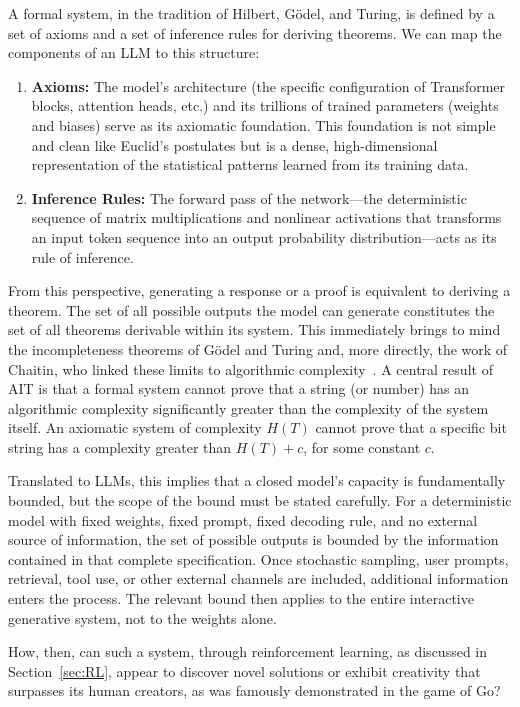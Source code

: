 \documentclass[%
  reprint,
  superscriptaddress,
  showpacs,
  showkeys,
  amsmath,amssymb,
  pra,
  longbibliography,
  floatfix,
  x11names
]{revtex4-2}
\begin{document}
A formal system, in the tradition of Hilbert, G\"odel, and Turing, is defined by a set of axioms and a set of inference rules for deriving theorems.
We can map the components of an LLM to this structure:
\begin{enumerate}
    \item \textbf{Axioms:} The model's architecture (the specific configuration of Transformer blocks, attention heads, etc.) and its trillions of trained parameters (weights and biases) serve as its axiomatic foundation. This foundation is not simple and clean like Euclid's postulates but is a dense, high-dimensional representation of the statistical patterns learned from its training data.
    \item \textbf{Inference Rules:} The forward pass of the network---the deterministic sequence of matrix multiplications and nonlinear activations that transforms an input token sequence into an output probability distribution---acts as its rule of inference.
\end{enumerate}

From this perspective, generating a response or a proof is equivalent to deriving a theorem.
The set of all possible outputs the model can generate constitutes the set of all theorems
derivable within its system.
This immediately brings to mind the incompleteness theorems of G\"odel and Turing and,
 more directly, the work of Chaitin,
who linked these limits to algorithmic complexity~\cite{chaitin-ACM,Chaitin199283,chaitin2}.
A central result of AIT is that a formal system cannot prove that a string (or number)
has an algorithmic complexity significantly greater than the complexity of the system itself.
An axiomatic system of complexity $H(T)$ cannot prove that a specific bit string
has a complexity greater than $H(T)+c$, for some constant $c$.

Translated to LLMs, this implies that a closed model's capacity is fundamentally bounded, but the scope of the bound must be stated carefully.
For a deterministic model with fixed weights, fixed prompt, fixed decoding rule, and no external source of information, the set of possible outputs is bounded by the information contained in that complete specification.
Once stochastic sampling, user prompts, retrieval, tool use, or other external channels are included, additional information enters the process.
The relevant bound then applies to the entire interactive generative system, not to the weights alone.

How, then, can such a system, through reinforcement learning, as discussed in Section~\ref{sec:RL},
appear to discover novel solutions or exhibit creativity that surpasses
its human creators, as was famously demonstrated in the game of Go?
\end{document}
